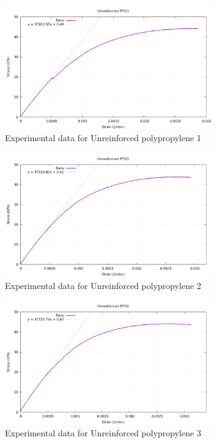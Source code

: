 \begin{figure}[h]
	\centering
	\includegraphics[width=0.8\textwidth]{img/neat_PP1.png}
	\caption{Experimental data for Unreinforced polypropylene 1}
\end{figure}
\begin{figure}[h]
	\centering
	\includegraphics[width=0.8\textwidth]{img/neat_PP2.png}
	\caption{Experimental data for Unreinforced polypropylene 2}
\end{figure}
\begin{figure}[h]
	\centering
	\includegraphics[width=0.8\textwidth]{img/neat_PP3.png}
	\caption{Experimental data for Unreinforced polypropylene 3}
\end{figure}
